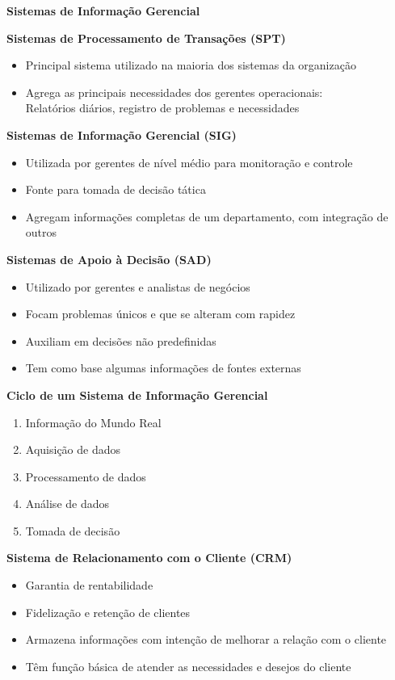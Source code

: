 \documentclass[12pt, a4paper]{article}
\begin{document}
{\Large

\noindent
\textbf{Sistemas de Informação Gerencial}


\textbf{Sistemas de Processamento de Transações (SPT)}
\begin{itemize}
    \item Principal sistema utilizado na maioria dos sistemas da organização
    \item Agrega as principais necessidades dos gerentes operacionais: \\
    Relatórios diários, registro de problemas e necessidades
\end{itemize}

\textbf{Sistemas de Informação Gerencial (SIG)}
\begin{itemize}
    \item Utilizada por gerentes de nível médio para monitoração e controle
    \item Fonte para tomada de decisão tática
    \item Agregam informações completas de um departamento, com integração de outros
\end{itemize}

\textbf{Sistemas de Apoio à Decisão (SAD)}
\begin{itemize}
    \item Utilizado por gerentes e analistas de negócios
    \item Focam problemas únicos e que se alteram com rapidez
    \item Auxiliam em decisões não predefinidas
    \item Tem como base algumas informações de fontes externas
\end{itemize}

\textbf{Ciclo de um Sistema de Informação Gerencial}
\begin{enumerate}[label=\textbf{\Roman*}]
    \item Informação do Mundo Real
    \item Aquisição de dados
    \item Processamento de dados
    \item Análise de dados
    \item Tomada de decisão
\end{enumerate}

\newpage
\vspace*{1cm}

\textbf{Sistema de Relacionamento com o Cliente (CRM)}
\begin{itemize}
    \item Garantia de rentabilidade
    \item Fidelização e retenção de clientes
    \item Armazena informações com intenção de melhorar a relação com o cliente
    \item Têm função básica de atender as necessidades e desejos do cliente
\end{itemize}

}
\end{document}
